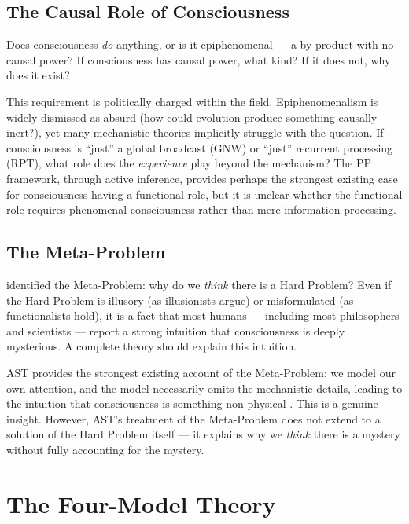 \documentclass[12pt]{article}
\begin{document}
\subsection{The Causal Role of Consciousness}


Does consciousness \emph{do} anything, or is it epiphenomenal --- a by-product with no causal power? If consciousness has causal power, what kind? If it does not, why does it exist?

This requirement is politically charged within the field. Epiphenomenalism \citep{Huxley1874,Jackson1982} is widely dismissed as absurd (how could evolution produce something causally inert?), yet many mechanistic theories implicitly struggle with the question. If consciousness is ``just'' a global broadcast (GNW) or ``just'' recurrent processing (RPT), what role does the \emph{experience} play beyond the mechanism? The PP framework, through active inference, provides perhaps the strongest existing case for consciousness having a functional role, but it is unclear whether the functional role requires phenomenal consciousness rather than mere information processing.


\subsection{The Meta-Problem}


\citet{Chalmers2018} identified the Meta-Problem: why do we \emph{think} there is a Hard Problem? Even if the Hard Problem is illusory (as illusionists argue) or misformulated (as functionalists hold), it is a fact that most humans --- including most philosophers and scientists --- report a strong intuition that consciousness is deeply mysterious. A complete theory should explain this intuition.

AST provides the strongest existing account of the Meta-Problem: we model our own attention, and the model necessarily omits the mechanistic details, leading to the intuition that consciousness is something non-physical \citep{Graziano2013}. This is a genuine insight. However, AST's treatment of the Meta-Problem does not extend to a solution of the Hard Problem itself --- it explains why we \emph{think} there is a mystery without fully accounting for the mystery.



\section{The Four-Model Theory}
\end{document}
